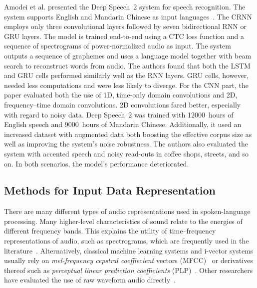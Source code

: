 Amodei et al. presented the Deep Speech~2 system for speech recognition. The system supports English and Mandarin Chinese as input languages~\cite{amodei2015deep}. The CRNN employs only three convolutional layers followed by seven bidirectional RNN or GRU layers. The model is trained end-to-end using a CTC loss function and a sequence of spectrograms of power-normalized audio as input. The system outputs a sequence of graphemes and uses a language model together with beam search to reconstruct words from audio. The authors found that both the LSTM and GRU cells performed similarly well as the RNN layers. GRU cells, however, needed less computations and were less likely to diverge. For the CNN part, the paper evaluated both the use of 1D, time-only domain convolutions and 2D, frequency--time domain convolutions. 2D convolutions fared better, especially with regard to noisy data.
Deep Speech~2 was trained with \num{12000}~hours of English speech and \num{9000}~hours of Mandarin Chinese. Additionally, it used an increased dataset with augmented data both boosting the effective corpus size as well as improving the system's noise robustness. The authors also evaluated the system with accented speech and noisy read-outs in coffee shops, streets, and so on. In both scenarios, the model's performance deteriorated.

\subsection{Methods for Input Data Representation}
There are many different types of audio representations used in spoken-language processing. Many higher-level characteristics of sound relate to the energies of different frequency bands. This explains the utility of time--frequency representations of audio, such as spectrograms, which are frequently used in the literature~\cite{montavon2009deep, dieleman2013multiscale, lee2009unsupervised, wulfing2012unsupervised, henaff2011unsupervised}. Alternatively, classical machine learning systems and i-vector systems usually rely on \emph{mel-frequency cepstral coeffiecient} vectors (MFCC)~\cite{richardson2015unified, dehak2011front, garcia2011analysis} or derivatives thereof such as \emph{perceptual linear prediction coefficients} (PLP)~\cite{gonzalez2014automatic}. Other researchers have evaluated the use of raw waveform audio directly~\cite{dieleman2014end, collobert2016wav2letter}.

